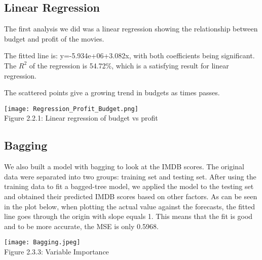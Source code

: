 \documentclass[12pt]{article}
\begin{document}
\begin{multicols}{2}
\subsection{Linear Regression}
\bigskip
The first analysis we did was a linear regression showing the relationship between budget and profit of the movies. \par 
The fitted line is: y=-5.934e+06+3.082x, with both coefficients being significant. 
The $R^2$ of the regression is 54.72\%, which is a satisfying result for linear regression.\par
The scattered points give a growing trend in budgets as times passes. 
\begin{center}
\texttt{[image: Regression\_Profit\_Budget.png]}\\
Figure 2.2.1: Linear regression of budget vs profit
\end{center}
\par

\subsection{Bagging}
\bigskip
We also built a model with bagging to look at the IMDB scores. The original data were separated into two groups: training set and testing set. After using the training data to fit a bagged-tree model, we applied the model to the testing set and obtained their predicted IMDB scores based on other factors. As can be seen in the plot below, when plotting the actual value against the forecasts, the fitted line goes through the origin with slope equals 1. This means that the fit is good and to be more accurate, the MSE is only 0.5968. 

\begin{center}
\texttt{[image: Bagging.jpeg]}\\
Figure 2.3.3: Variable Importance
\end{center}


\end{multicols}
\end{document}
